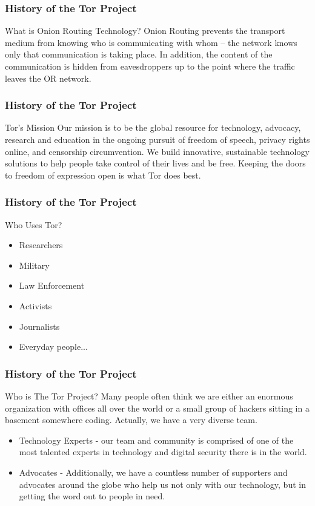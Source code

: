 \documentclass{beamer}
\begin{document}
\begin{frame}
\frametitle{History of the Tor Project}
	\begin{block}{What is Onion Routing Technology?}
          Onion Routing prevents the transport medium from knowing who is communicating with whom -- the network knows only that communication is taking place. In addition, the content of the communication is hidden from eavesdroppers up to the point where the traffic leaves the OR network.
	\end{block}
\end{frame}

\begin{frame}
\frametitle{History of the Tor Project}
	\begin{block}{Tor's Mission}
          Our mission is to be the global resource for technology, advocacy, research and education in the ongoing pursuit of freedom of speech, privacy rights online, and censorship circumvention. We build innovative, sustainable technology solutions to help people take control of their lives and be free. Keeping the doors to freedom of expression open is what Tor does best.
	\end{block}
\end{frame}

\begin{frame}
\frametitle{History of the Tor Project}
	\begin{block}{Who Uses Tor?}
		\begin{itemize}
			\item<1-> Researchers \pause
			\item<2-> Military \pause
			\item<3-> Law Enforcement \pause
			\item<4-> Activists \pause
			\item<5-> Journalists \pause
			\item<6-> Everyday people...
		\end{itemize}
	\end{block}
\end{frame}

\begin{frame}
\frametitle{History of the Tor Project}
	\begin{block}{Who is The Tor Project?}
          Many people often think we are either an enormous organization with offices all over the world or a small group of hackers sitting in a basement somewhere coding. Actually, we have a very diverse team. \pause
		\begin{itemize}
			\item<1-> Technology Experts - our team and community is comprised of one of the most talented experts in technology and digital security there is in the world. \pause
			\item<2-> Advocates - Additionally, we have a countless number of supporters and advocates around the globe who help us not only with our technology, but in getting the word out to people in need.
		\end{itemize}
	\end{block}
\end{frame}
\end{document}
